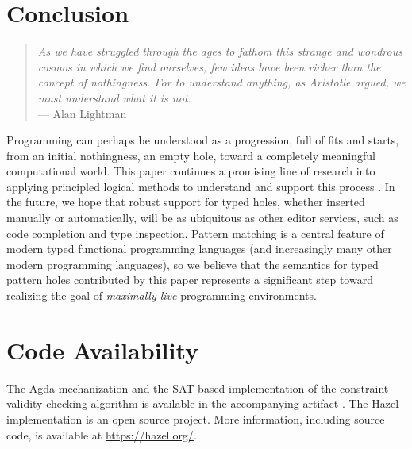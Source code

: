 \section{Conclusion}
\begin{quote}
    \emph{As we have struggled through the ages to fathom this strange and wondrous cosmos in which we find ourselves, few ideas have been richer than the concept of nothingness. For to understand anything, as Aristotle argued, we must understand what it is not.}
    \\\null\hfill --- Alan Lightman
\end{quote}

\noindent
Programming can perhaps be understood as a progression, full of fits and starts, from an initial nothingness, an empty hole, toward a completely meaningful computational world. This paper continues a promising line of research into applying principled logical methods to understand and support this process \cite{DBLP:conf/popl/OmarVHAH17,HazelnutSNAPL}. In the future, we hope that robust support for typed holes, whether inserted manually or automatically, will be as ubiquitous as other editor services, such as code completion and type inspection. 
Pattern matching is a central feature of modern typed functional programming languages (and increasingly many other modern 
programming languages), so we believe that the semantics for typed pattern holes contributed by this paper represents a significant step toward realizing the goal of \emph{maximally live} programming environments.

\section{Code Availability}

The Agda mechanization and the SAT-based implementation of the constraint validity checking algorithm is available in the accompanying artifact \cite{yuan_yongwei_2023_7713722}. The Hazel implementation is an open source project. More information, including source code, is available at \url{https://hazel.org/}.



